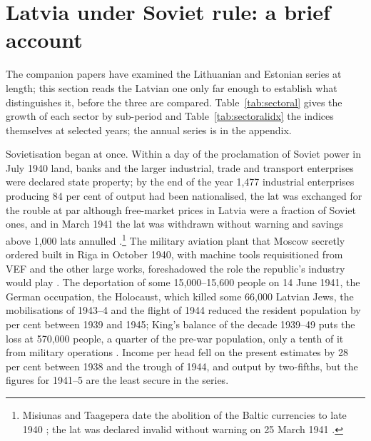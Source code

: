 \section{Latvia under Soviet rule: a brief account}
\label{sec:latvia}

The companion papers have examined the Lithuanian and Estonian series at length; this section reads the Latvian one only far enough to establish what distinguishes it, before the three are compared. Table~\ref{tab:sectoral} gives the growth of each sector by sub-period and Table~\ref{tab:sectoralidx} the indices themselves at selected years; the annual series is in the appendix.





Sovietisation began at once. Within a day of the proclamation of Soviet power in July 1940 land, banks and the larger industrial, trade and transport enterprises were declared state property; by the end of the year 1,477 industrial enterprises producing 84 per cent of output had been nationalised, the lat was exchanged for the rouble at par although free-market prices in Latvia were a fraction of Soviet ones, and in March 1941 the lat was withdrawn without warning and savings above 1,000 lats annulled \parencites[183--8]{krumins_2017_tautsaimnieciba_1940}[32--3]{years_of_dependence}[290, 294]{terleckaspinigai}.\footnote{Misiunas and Taagepera date the abolition of the Baltic currencies to late 1940 \parencite[33]{years_of_dependence}; the lat was declared invalid without warning on 25 March 1941 \parencite[188]{krumins_2017_tautsaimnieciba_1940}.} The military aviation plant that Moscow secretly ordered built in Riga in October 1940, with machine tools requisitioned from VEF and the other large works, foreshadowed the role the republic's industry would play \parencite[194--5]{krumins_2017_tautsaimnieciba_1940}. The deportation of some 15,000--15,600 people on 14 June 1941, the German occupation, the Holocaust, which killed some 66,000 Latvian Jews, the mobilisations of 1943--4 and the flight of 1944 reduced the resident population by \lvPOPchangeWARtwo{} per cent between 1939 and 1945; King's balance of the decade 1939--49 puts the loss at 570,000 people, a quarter of the pre-war population, only a tenth of it from military operations \parencites[53--4]{labsvirs_1959_case}[81--94]{king_1965_economic}[42, 64]{years_of_dependence}. Income per head fell on the present estimates by 28 per cent between 1938 and the trough of 1944, and output by two-fifths, but the figures for 1941--5 are the least secure in the series.

